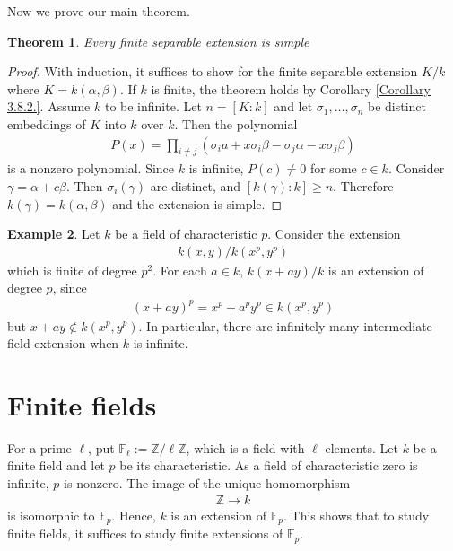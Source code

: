 \documentclass[12pt]{report}
\theoremstyle{plain}
\newtheorem{theorem}{Theorem}[section]
\theoremstyle{remark}
\theoremstyle{definition}
\newtheorem{example}[theorem]{Example}
\newcommand{\Z}{\mathbb{Z}}
\begin{document}
Now we prove our main theorem.

\begin{theorem}\label{Primitive Element Theorem}
    Every finite separable extension is simple
\end{theorem}
\begin{proof}
    With induction, it suffices to show for the finite separable extension $K/k$ where $K=k(\alpha,\beta)$. If $k$ is finite, the theorem holds by Corollary \ref{Corollary 3.8.2.}. Assume $k$ to be infinite. Let $n=[K:k]$ and let $\sigma_1,\dots,\sigma_n$ be distinct embeddings of $K$ into $\overline{k}$ over $k$. Then the polynomial
    \begin{align*}
        P(x) = \prod_{i\neq j} (\sigma_i a+x\sigma_i\beta - \sigma_j \alpha - x\sigma_j\beta)
    \end{align*}
    is a nonzero polynomial. Since $k$ is infinite, $P(c)\neq 0$ for some $c\in k$. Consider $\gamma=\alpha+c\beta$. Then $\sigma_i(\gamma)$ are distinct, and $[k(\gamma):k]\ge n$. Therefore $k(\gamma)=k(\alpha,\beta)$ and the extension is simple.
\end{proof}

\begin{example}
    Let $k$ be a field of characteristic $p$. Consider the extension
    \begin{align*}
        k(x,y)/k(x^p,y^p)
    \end{align*}
    which is finite of degree $p^2$. For each $a\in k$, $k(x+ay)/k$ is an extension of degree $p$, since
    \begin{align*}
        (x+ay)^p = x^p+a^py^p \in k(x^p,y^p)
    \end{align*}
    but $x+ay\notin k(x^p,y^p)$. In particular, there are infinitely many intermediate field extension when $k$ is infinite.
\end{example}


\clearpage
\section{Finite fields}

For a prime $\ell$, put $\mathbb{F}_\ell:=\Z/\ell\Z$, which is a field with $\ell$ elements. Let $k$ be a finite field and let $p$ be its characteristic. As a field of characteristic zero is infinite, $p$ is nonzero. The image of the unique homomorphism
\begin{align*}
    \Z\rightarrow k
\end{align*}
is isomorphic to $\mathbb{F}_p$. Hence, $k$ is an extension of $\mathbb{F}_p$. This shows that to study finite fields, it suffices to study finite extensions of $\mathbb{F}_p$.
\end{document}
